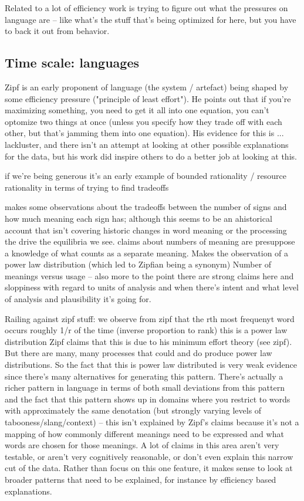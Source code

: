 \documentclass[]{article}
\begin{document}
Related to a lot of efficiency work is trying to figure out what the pressures on language are -- like what's the stuff that's being optimized for here, but you have to back it out from behavior. 

\subsection{Time scale: languages}

Zipf is an early proponent of language (the system / artefact) being shaped by some efficiency pressure ("principle of least effort"). He points out that if you're maximizing something, you need to get it all into one equation, you can't optomize two things at once (unless you specify how they trade off with each other, but that's jamming them into one equation). His evidence for this is ... lackluster, and there isn't an attempt at looking at other possible explanations for the data, but his work did inspire others to do a better job at looking at this. 

\cite{zipf1949} if we're being generous it's an early example of bounded rationality / resource rationality in terms of trying to find tradeoffs 

\cite{zipf1949} makes some observations about the tradeoffs between the number of signs and how much meaning each sign has; although this seems to be an ahistorical account that isn't covering historic changes in word meaning or the processing the drive the equilibria we see. claims about numbers of meaning are presuppose a knowledge of what counts as a separate meaning. Makes the observation of a power law distribution (which led to Zipfian being a synonym) Number of meanings versus usage -- also more to the point there are strong claims here and sloppiness with regard to units of analysis and when there's intent and what level of analysis and plausibility it's going for. 

Railing against zipf stuff: \cite{piantadosi2014} we observe from zipf that the rth most frequenyt word occurs roughly 1/r of the time (inverse proportion to rank) this is a power law distribution 
Zipf claims that this is due to his minimum effort theory (see zipf). But there are many, many processes that could and do produce power law distributions. So the fact that this is power law distributed is very weak evidence since there's many alternatives for generating this pattern. There's actually a richer pattern in language in terms of both small deviations from this pattern and the fact that this pattern shows up in domains where you restrict to words with approximately the same denotation (but strongly varying levels of tabooness/slang/context) -- this isn't explained by Zipf's claims because it's not a mapping of how commonly different meanings need to be expressed and what words are chosen for those meanings. A lot of claims in this area aren't very testable, or aren't very cognitively reasonable, or don't even explain this narrow cut of the data. Rather than focus on this one feature, it makes sense to look at broader patterns that need to be explained, for instance by efficiency based explanations. 
\end{document}
